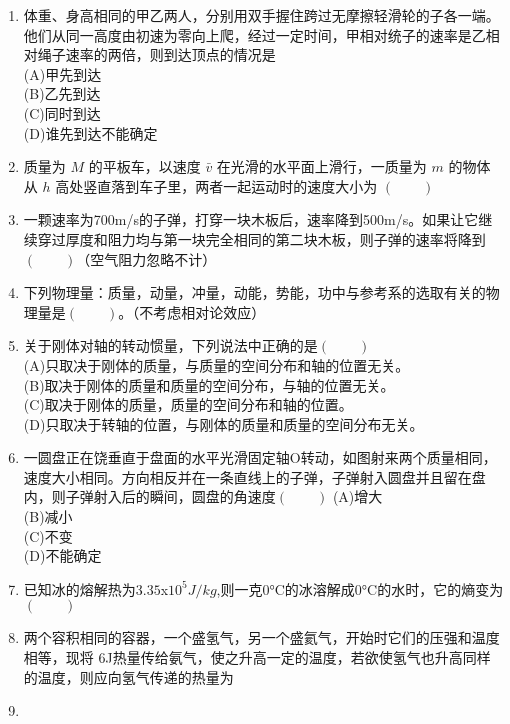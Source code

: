 \begin{enumerate}
\item 体重、身高相同的甲乙两人，分别用双手握住跨过无摩擦轻滑轮的子各一端。他们从同一高度由初速为零向上爬，经过一定时间，甲相对统子的速率是乙相对绳子速率的两倍，则到达顶点的情况是\\
(A)甲先到达\\
(B)乙先到达\\
(C)同时到达\\
(D)谁先到达不能确定
\item 质量为 $M$ 的平板车，以速度 $\bar v$ 在光滑的水平面上滑行，一质量为 $m$ 的物体从 $h$  高处竖直落到车子里，两者一起运动时的速度大小为 $(\qquad)$
\item  一颗速率为700m/s的子弹，打穿一块木板后，速率降到500m/s。如果让它继续穿过厚度和阻力均与第一块完全相同的第二块木板，则子弹的速率将降到$(\qquad)$（空气阻力忽略不计）
\item  下列物理量：质量，动量，冲量，动能，势能，功中与参考系的选取有关的物理量是$(\qquad)$。（不考虑相对论效应）
\item  关于刚体对轴的转动惯量，下列说法中正确的是$(\qquad)$\\
(A)只取决于刚体的质量，与质量的空间分布和轴的位置无关。\\
(B)取决于刚体的质量和质量的空间分布，与轴的位置无关。\\
(C)取决于刚体的质量，质量的空间分布和轴的位置。\\
(D)只取决于转轴的位置，与刚体的质量和质量的空间分布无关。
\item 一圆盘正在饶垂直于盘面的水平光滑固定轴O转动，如图射来两个质量相同，速度大小相同。方向相反并在一条直线上的子弹，子弹射入圆盘并且留在盘内，则子弹射入后的瞬间，圆盘的角速度$(\qquad)$
(A)增大\\
(B)减小\\
(C)不变\\
(D)不能确定
\item 已知冰的熔解热为$3.35$x$10^5J/kg$,则一克$0$°C的冰溶解成$0$°C的水时，它的熵变为$(\qquad)$
\item 两个容积相同的容器，一个盛氢气，另一个盛氦气，开始时它们的压强和温度相等，现将 6J热量传给氨气，使之升高一定的温度，若欲使氢气也升高同样的温度，则应向氢气传递的热量为
\item 
\end{enumerate}